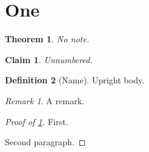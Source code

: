 \documentclass{article}
\newtheorem{theorem}{Theorem}[section]
\newtheorem*{claim}{Claim}
\theoremstyle{definition}
\newtheorem{definition}[theorem]{Definition}
\theoremstyle{remark}
\newtheorem*{remark}{Remark}
\begin{document}
\section{One}
\begin{theorem}\label{t}No note.\end{theorem}
\begin{claim}Unnumbered.\end{claim}
\begin{definition}[Name] Upright body.\end{definition}
\begin{remark}A remark.\end{remark}
\begin{proof}[Proof of \ref{t}]First.

Second paragraph.\end{proof}
\end{document}
